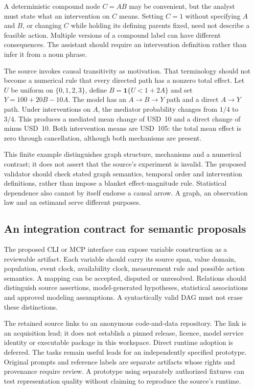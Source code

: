 A deterministic compound node $C=AB$ may be convenient, but the analyst must state what an intervention on $C$ means. Setting $C=1$ without specifying $A$ and $B$, or changing $C$ while holding its defining parents fixed, need not describe a feasible action. Multiple versions of a compound label can have different consequences. The assistant should require an intervention definition rather than infer it from a noun phrase.

The source invokes causal transitivity as motivation. That terminology should not become a numerical rule that every directed path has a nonzero total effect. Let $U$ be uniform on $\{0,1,2,3\}$, define $B=\mathbf 1\{U<1+2A\}$ and set $Y=100+20B-10A$. The model has an $A\to B\to Y$ path and a direct $A\to Y$ path. Under interventions on $A$, the mediator probability changes from $1/4$ to $3/4$. This produces a mediated mean change of USD~10 and a direct change of minus USD~10. Both intervention means are USD~105: the total mean effect is zero through cancellation, although both mechanisms are present.~\citep{exec28_cm_reference}

This finite example distinguishes graph structure, mechanisms and a numerical contrast; it does not assert that the source's experiment is invalid. The proposed validator should check stated graph semantics, temporal order and intervention definitions, rather than impose a blanket effect-magnitude rule. Statistical dependence also cannot by itself endorse a causal arrow. A graph, an observation law and an estimand serve different purposes.

\subsection{An integration contract for semantic proposals}

The proposed CLI or MCP interface can expose variable construction as a reviewable artifact. Each variable should carry its source span, value domain, population, event clock, availability clock, measurement rule and possible action semantics. A mapping can be accepted, disputed or unresolved. Relations should distinguish source assertions, model-generated hypotheses, statistical associations and approved modeling assumptions. A syntactically valid DAG must not erase these distinctions.

The retained source links to an anonymous code-and-data repository. The link is an acquisition lead; it does not establish a pinned release, licence, model service identity or executable package in this workspace. Direct runtime adoption is deferred. The tasks remain useful leads for an independently specified prototype. Original prompts and reference labels are separate artifacts whose rights and provenance require review. A prototype using separately authorized fixtures can test representation quality without claiming to reproduce the source's runtime.

